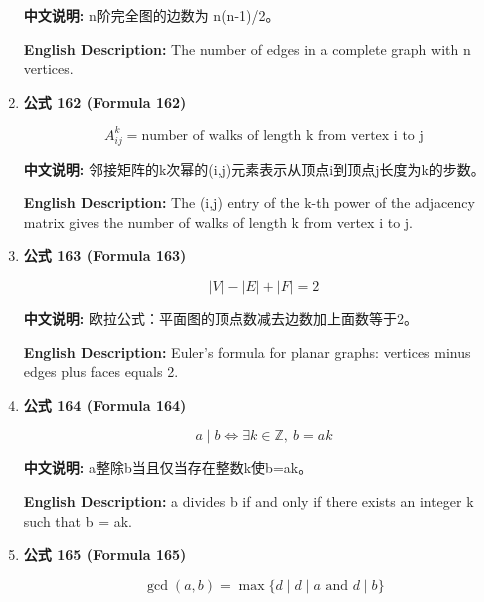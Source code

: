 \documentclass[12pt,a4paper]{article}
\begin{document}
\begin{enumerate}[leftmargin=*]
\textbf{中文说明:} n阶完全图的边数为 n(n-1)/2。

\textbf{English Description:} The number of edges in a complete graph with n vertices.

\vspace{0.5cm}

\item \textbf{公式 162 (Formula 162)}

\begin{equation}
A^k_{ij} = \text{number of walks of length k from vertex i to j}
\end{equation}

\textbf{中文说明:} 邻接矩阵的k次幂的(i,j)元素表示从顶点i到顶点j长度为k的步数。

\textbf{English Description:} The (i,j) entry of the k-th power of the adjacency matrix gives the number of walks of length k from vertex i to j.

\vspace{0.5cm}

\item \textbf{公式 163 (Formula 163)}

\begin{equation}
|V| - |E| + |F| = 2
\end{equation}

\textbf{中文说明:} 欧拉公式：平面图的顶点数减去边数加上面数等于2。

\textbf{English Description:} Euler's formula for planar graphs: vertices minus edges plus faces equals 2.

\vspace{0.5cm}

\item \textbf{公式 164 (Formula 164)}

\begin{equation}
a \mid b \iff \exists k \in \mathbb{Z},\ b = ak
\end{equation}

\textbf{中文说明:} a整除b当且仅当存在整数k使b=ak。

\textbf{English Description:} a divides b if and only if there exists an integer k such that b = ak.

\vspace{0.5cm}

\item \textbf{公式 165 (Formula 165)}

\begin{equation}
\gcd(a, b) = \max\{d \mid d \mid a \text{ and } d \mid b\}
\end{equation}


\end{enumerate}
\end{document}
